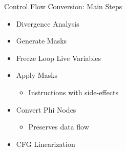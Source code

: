 
\begin{frame}{Control Flow Conversion: Main Steps}

\begin{itemize}
    \item Divergence Analysis
    \item Generate Masks
    \item Freeze Loop Live Variables
    \item Apply Masks
    \begin{itemize}
        \item Instructions with side-effects
    \end{itemize}
    \item Convert Phi Nodes
    \begin{itemize}
        \item Preserves data flow
    \end{itemize}
    \item CFG Linearization
\end{itemize}

\end{frame}


